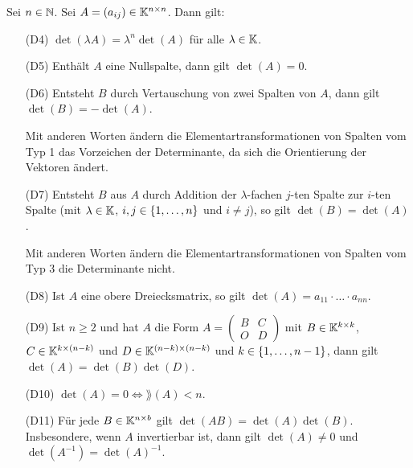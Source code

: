 \begin{thm}
	Sei $ n \in \mathbb N $. Sei $ A = (a_{ij}) \in \mathbb K^{n \times n} $. Dann gilt:
	\begin{itemize}
		\item[\normalfont(D4)]
			$ \det(\lambda A) = \lambda^n \det(A) $ für alle $ \lambda \in \mathbb K $.
		\item[\normalfont(D5)]
			Enthält $ A $ eine Nullspalte, dann gilt $ \det(A) = 0 $.
		\item[\normalfont(D6)]
			Entsteht $ B $ durch Vertauschung von zwei Spalten von $ A $, dann gilt $ \det(B) = -\det(A) $.
			
			Mit anderen Worten ändern die Elementartransformationen von Spalten vom Typ 1 das Vorzeichen der Determinante, da sich die Orientierung der Vektoren ändert.
		\item[\normalfont(D7)]
			Entsteht $ B $ aus $ A $ durch Addition der $ \lambda $-fachen $ j $-ten Spalte zur $ i $-ten Spalte (mit $ \lambda \in \mathbb K $, $ i,j \in \{ 1,\ldots,n \} $ und $ i \neq j $), so gilt $ \det(B) = \det(A) $.
			
			Mit anderen Worten ändern die Elementartransformationen von Spalten vom Typ 3 die Determinante nicht.
		\item[\normalfont(D8)]
			Ist $ A $ eine obere Dreiecksmatrix, so gilt $ \det(A) = a_{11} \cdot \ldots \cdot a_{nn} $.
		\item[\normalfont(D9)]
			Ist $ n \geq 2 $ und hat $ A $ die Form $ A = \begin{pmatrix} B & C \\ O & D \end{pmatrix} $ mit $ B \in \mathbb K^{k \times k} $, $ C \in \mathbb K^{k \times (n-k)} $ und $ D \in \mathbb K^{(n-k) \times (n-k)} $ und $ k \in \{ 1,\ldots,n-1 \} $, dann gilt $ \det(A) = \det(B)\det(D) $.
		\item[\normalfont(D10)]
			$ \det(A) = 0 \Leftrightarrow \rang(A) < n $.
		\item[\normalfont(D11)]
			Für jede $ B \in \mathbb K^{n \times b} $ gilt $ \det(AB) = \det(A)\det(B) $. Insbesondere, wenn $ A $ invertierbar ist, dann gilt $ \det(A) \neq 0 $ und $ \det(A^{-1}) = \det(A)^{-1} $.
	\end{itemize}
\end{thm}
